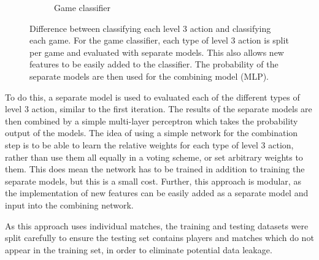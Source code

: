 \documentclass[Report.tex]{subfiles}
\begin{document}
\begin{figure}[H]
\begin{subfigure}{1\textwidth}
\caption{Game classifier}
\end{subfigure}
\caption{Difference between classifying each level 3 action and classifying each game. For the game classifier, each type of level 3 action is split per game and evaluated with separate models. This also allows new features to be easily added to the classifier. The probability of the separate models are then used for the combining model (MLP).}
\end{figure}

To do this, a separate model is used to evaluated each of the different types of level 3 action, similar to the first iteration. The results of the separate models are then combined by a simple multi-layer perceptron which takes the probability output of the models. The idea of using a simple network for the combination step is to be able to learn the relative weights for each type of level 3 action, rather than use them all equally in a voting scheme, or set arbitrary weights to them. This does mean the network has to be trained in addition to training the separate models, but this is a small cost. Further, this approach is modular, as the implementation of new features can be easily added as a separate model and input into the combining network.


As this approach uses individual matches, the training and testing datasets were split carefully to ensure the testing set contains players and matches which do not appear in the training set, in order to eliminate potential data leakage. 
\end{document}
